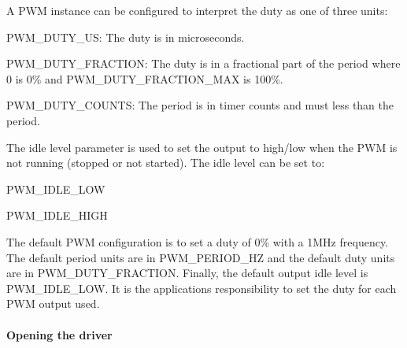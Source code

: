 A P\+W\+M instance can be configured to interpret the duty as one of three units\+:
\begin{DoxyItemize}
\item P\+W\+M\+\_\+\+D\+U\+T\+Y\+\_\+\+U\+S\+: The duty is in microseconds.
\item P\+W\+M\+\_\+\+D\+U\+T\+Y\+\_\+\+F\+R\+A\+C\+T\+I\+O\+N\+: The duty is in a fractional part of the period where 0 is 0\% and P\+W\+M\+\_\+\+D\+U\+T\+Y\+\_\+\+F\+R\+A\+C\+T\+I\+O\+N\+\_\+\+M\+A\+X is 100\%.
\item P\+W\+M\+\_\+\+D\+U\+T\+Y\+\_\+\+C\+O\+U\+N\+T\+S\+: The period is in timer counts and must less than the period.
\end{DoxyItemize}

The idle level parameter is used to set the output to high/low when the P\+W\+M is not running (stopped or not started). The idle level can be set to\+:
\begin{DoxyItemize}
\item P\+W\+M\+\_\+\+I\+D\+L\+E\+\_\+\+L\+O\+W
\item P\+W\+M\+\_\+\+I\+D\+L\+E\+\_\+\+H\+I\+G\+H
\end{DoxyItemize}

The default P\+W\+M configuration is to set a duty of 0\% with a 1\+M\+Hz frequency. The default period units are in P\+W\+M\+\_\+\+P\+E\+R\+I\+O\+D\+\_\+\+H\+Z and the default duty units are in P\+W\+M\+\_\+\+D\+U\+T\+Y\+\_\+\+F\+R\+A\+C\+T\+I\+O\+N. Finally, the default output idle level is P\+W\+M\+\_\+\+I\+D\+L\+E\+\_\+\+L\+O\+W. It is the application\textquotesingle{}s responsibility to set the duty for each P\+W\+M output used.

\paragraph*{Opening the driver}




